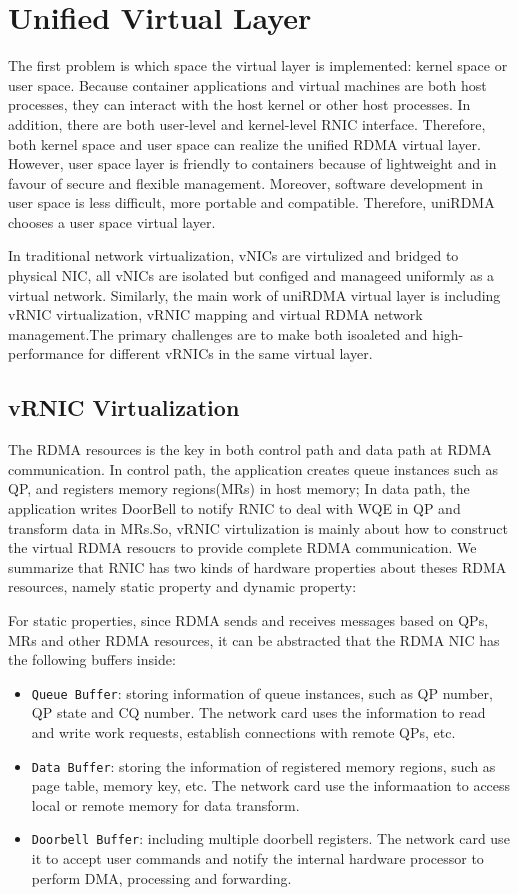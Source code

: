 \documentclass[sigplan,screen]{acmart}
\begin{document}
\section{Unified Virtual Layer}
The first problem is which space the virtual layer is implemented: kernel space or user space. Because container applications and virtual machines are both host processes, they can interact with the host kernel or other host processes. In addition, there are both user-level and kernel-level RNIC interface. Therefore, both kernel space and user space can realize the unified RDMA virtual layer. However, user space layer is friendly to containers because of lightweight and in favour of secure and flexible management. Moreover, software development in user space is less difficult, more portable and compatible. Therefore, uniRDMA chooses a user space virtual layer.

In traditional network virtualization, vNICs are virtulized and bridged to physical NIC, all vNICs are isolated but configed and manageed uniformly as a virtual network. Similarly, the main work of uniRDMA virtual layer is including vRNIC virtualization, vRNIC mapping  and virtual RDMA network management.The primary challenges are to make both isoaleted and high-performance for different vRNICs in the same virtual layer. 
	
\subsection{vRNIC Virtualization}
The RDMA resources is the key in both control path and data path at RDMA communication. In control path, the application creates queue instances such as QP, and registers memory regions(MRs) in host memory; In data path, the application writes DoorBell to notify RNIC to deal with WQE in QP and transform data in MRs.So, vRNIC virtulization is mainly about how to construct the virtual RDMA resoucrs to provide complete RDMA communication. We summarize that RNIC has two kinds of hardware properties about theses RDMA resources, namely static property and dynamic property:

For static properties,  since RDMA sends and receives messages based on QPs, MRs and other RDMA resources, it can be abstracted that the RDMA NIC has the following buffers inside:

\begin{itemize}
\item {\verb|Queue Buffer|}: storing information of queue instances, such as QP number, QP state and CQ number. The network card uses the information to read and write work requests, establish connections with remote QPs, etc.  
\item {\verb|Data Buffer|}: storing the information of registered memory regions, such as page table, memory key, etc. The network card use the informaation to access local or remote memory for data transform.  
\item {\verb|Doorbell Buffer|}: including multiple doorbell registers. The network card use it to accept user commands and notify the internal hardware processor to perform DMA, processing and forwarding. 
\end{itemize}
\end{document}
